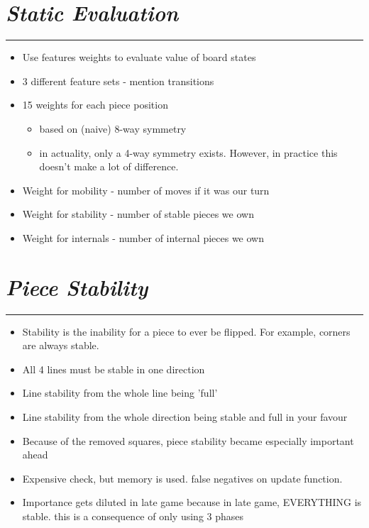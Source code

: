 \documentclass[10pt]{report}
\begin{document}
\section*{\emph{Static Evaluation}}
\hrule
    \begin{itemize}
  \item
    Use features weights to evaluate value of board states
  \item
    3 different feature sets - mention transitions
  \item
    15 weights for each piece position
	\begin{itemize}
		\item based on (naive) 8-way symmetry
		\item in actuality, only a 4-way symmetry exists. However, in practice this doesn't make a lot of difference.
	\end{itemize}
  \item
    Weight for mobility - number of moves if it was our turn
  \item
   Weight for stability - number of stable pieces we own
  \item
   Weight for internals - number of internal pieces we own
  \end{itemize}

\section*{\emph{\textmd{Piece Stability}}}
\hrule
    \begin{itemize}
  \item
  Stability is the inability for a piece to ever be flipped. For example, corners are always stable.
  \item
   All 4 lines must be stable in one direction
  \item
   Line stability from the whole line being 'full'
  \item
   Line stability from the whole direction being stable and full in your favour
  \item
    Because of the removed squares, piece stability became especially important ahead
  \item
    Expensive check, but memory is used. false negatives on update function.
  \item
    Importance gets diluted in late game because in late game, EVERYTHING is stable. this is a consequence of only using 3 phases
  \end{itemize}
\end{document}

